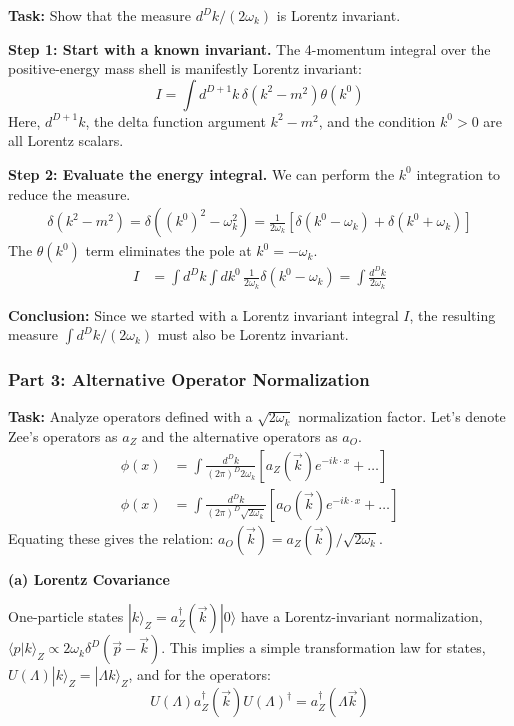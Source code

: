 \documentclass[11pt]{article}
\begin{document}
\begin{itemize}
\textbf{Task:} Show that the measure $d^Dk / (2\omega_k)$ is Lorentz invariant.

\textbf{Step 1: Start with a known invariant.} The 4-momentum integral over the positive-energy mass shell is manifestly Lorentz invariant:
\[ I = \int d^{D+1}k \, \delta(k^2 - m^2) \theta(k^0) \]
Here, $d^{D+1}k$, the delta function argument $k^2-m^2$, and the condition $k^0 > 0$ are all Lorentz scalars.

\textbf{Step 2: Evaluate the energy integral.} We can perform the $k^0$ integration to reduce the measure.
\begin{align*}
    \delta(k^2 - m^2) = \delta((k^0)^2 - \omega_k^2) = \frac{1}{2\omega_k} \left[ \delta(k^0 - \omega_k) + \delta(k^0 + \omega_k) \right]
\end{align*}
The $\theta(k^0)$ term eliminates the pole at $k^0 = -\omega_k$.
\begin{align*}
    I &= \int d^Dk \int dk^0 \, \frac{1}{2\omega_k} \delta(k^0 - \omega_k) = \int \frac{d^Dk}{2\omega_k}
\end{align*}

\textbf{Conclusion:} Since we started with a Lorentz invariant integral $I$, the resulting measure $\int d^Dk/(2\omega_k)$ must also be Lorentz invariant.

\subsubsection{Part 3: Alternative Operator Normalization}

\textbf{Task:} Analyze operators defined with a $\sqrt{2\omega_k}$ normalization factor. Let's denote Zee's operators as $a_Z$ and the alternative operators as $a_O$.
\begin{align*}
    \phi(x) &= \int \frac{d^Dk}{(2\pi)^D 2\omega_k} [a_Z(\vec{k})e^{-ik\cdot x} + \dots] \\
    \phi(x) &= \int \frac{d^Dk}{(2\pi)^D \sqrt{2\omega_k}} [a_O(\vec{k})e^{-ik\cdot x} + \dots]
\end{align*}
Equating these gives the relation: $a_O(\vec{k}) = a_Z(\vec{k}) / \sqrt{2\omega_k}$.

\textbf{(a) Lorentz Covariance}

One-particle states $|k\rangle_Z = a_Z^\dagger(\vec{k})|0\rangle$ have a Lorentz-invariant normalization, $\langle p|k \rangle_Z \propto 2\omega_k \delta^D(\vec{p}-\vec{k})$. This implies a simple transformation law for states, $U(\Lambda)|k\rangle_Z = |\Lambda k\rangle_Z$, and for the operators:
\[ U(\Lambda) a_Z^\dagger(\vec{k}) U(\Lambda)^\dagger = a_Z^\dagger(\Lambda\vec{k}) \]


\end{itemize}
\end{document}
